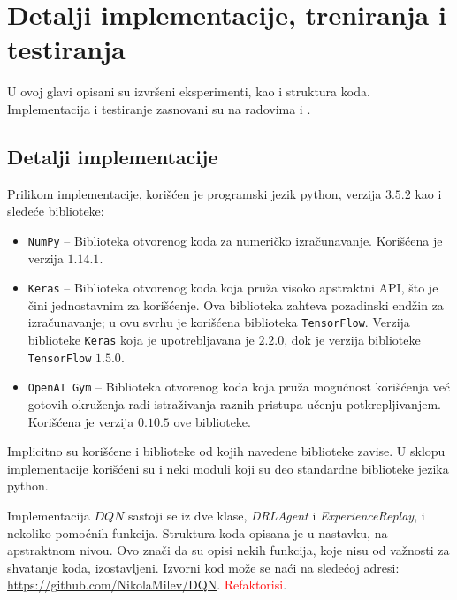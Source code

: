 \chapter{Detalji implementacije, treniranja i testiranja}
\label{ch:implementacija}

U ovoj glavi opisani su izvršeni eksperimenti, kao i struktura koda. Implementacija i testiranje zasnovani su na radovima \cite{dqn_mnih} i \cite{dqn_dm}.
\section{Detalji implementacije}
\label{sec:implementacija}
Prilikom implementacije, korišćen je programski jezik python\cite{python}, verzija $3.5.2$ kao i sledeće biblioteke:
\begin{itemize}
	\item \texttt{NumPy}\cite{numpy} -- Biblioteka otvorenog koda za numeričko izračunavanje. Korišćena je verzija $1.14.1$.
	\item \texttt{Keras}\cite{keras} -- Biblioteka otvorenog koda koja pruža visoko apstraktni API, što je čini jednostavnim za korišćenje. Ova biblioteka zahteva pozadinski endžin za izračunavanje; u ovu svrhu je korišćena biblioteka \texttt{TensorFlow}\cite{tensorflow}. Verzija biblioteke \texttt{Keras} koja je upotrebljavana je $2.2.0$, dok je verzija biblioteke \texttt{TensorFlow} $1.5.0$.
	\item  \texttt{OpenAI~Gym}\cite{openai_gym} -- Biblioteka otvorenog koda koja pruža mogućnost korišćenja već gotovih okruženja radi istraživanja raznih pristupa učenju potkrepljivanjem. Korišćena je verzija $0.10.5$ ove biblioteke.
\end{itemize}
Implicitno su korišćene i biblioteke od kojih navedene biblioteke zavise. U sklopu implementacije korišćeni su i neki moduli koji su deo standardne biblioteke jezika python.
\par 
Implementacija $DQN$ sastoji se iz dve klase, {\em DRLAgent} i {\em ExperienceReplay}, i nekoliko pomoćnih funkcija. Struktura koda opisana je u nastavku, na apstraktnom nivou. Ovo znači da su opisi nekih funkcija, koje nisu od važnosti za shvatanje koda, izostavljeni. Izvorni kod može se naći na sledećoj adresi: \url{https://github.com/NikolaMilev/DQN}. \textcolor{red}{Refaktorisi}.
\par 
